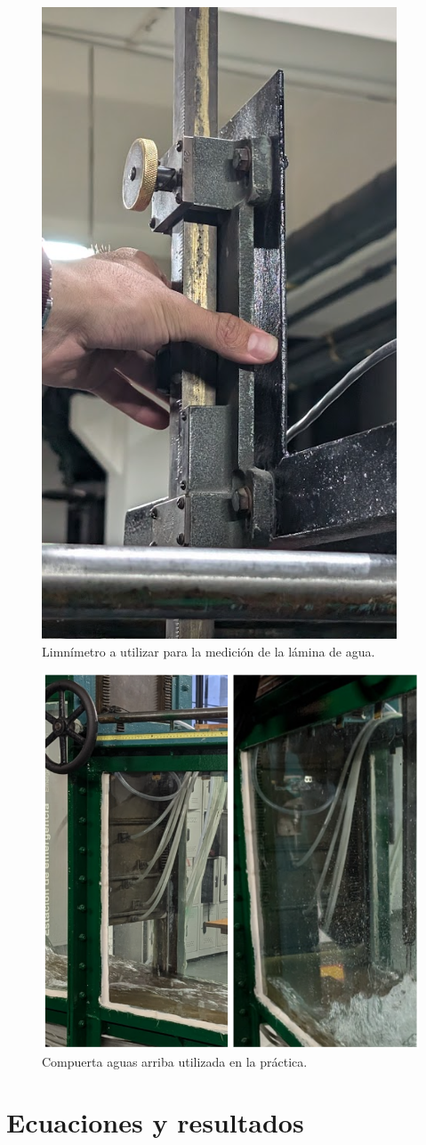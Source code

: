 \documentclass[10pt, a4paper]{exam}
\begin{document}
\newpage

\begin{figure}[h]
    \centering
    \includegraphics[width=0.3\linewidth]{Images/limnimetro.png}
    \caption{Limnímetro a utilizar para la medición de la lámina de agua.}
    \label{}
\end{figure}

\begin{figure}[h]
    \centering
    \includegraphics[width=0.38\linewidth]{Images/compuer2.png}
    \caption{Compuerta aguas arriba utilizada en la práctica.}
    \label{}
\end{figure}


\newpage

\section{Ecuaciones y resultados}
\end{document}

